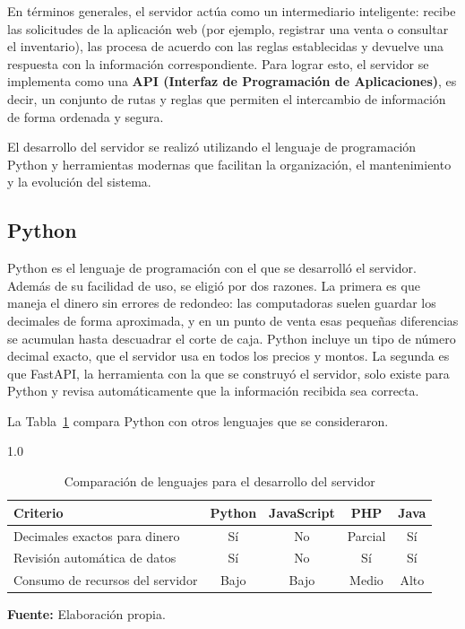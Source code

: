 En términos generales, el servidor actúa como un intermediario inteligente: recibe las solicitudes de la aplicación web (por ejemplo, registrar una venta o consultar el inventario), las procesa de acuerdo con las reglas establecidas y devuelve una respuesta con la información correspondiente. Para lograr esto, el servidor se implementa como una \textbf{API (Interfaz de Programación de Aplicaciones)}, es decir, un conjunto de rutas y reglas que permiten el intercambio de información de forma ordenada y segura.

El desarrollo del servidor se realizó utilizando el lenguaje de programación Python y herramientas modernas que facilitan la organización, el mantenimiento y la evolución del sistema.

\subsection{Python}

Python es el lenguaje de programación con el que se desarrolló el servidor. Además de su facilidad de uso, se eligió por dos razones. La primera es que maneja el dinero sin errores de redondeo: las computadoras suelen guardar los decimales de forma aproximada, y en un punto de venta esas pequeñas diferencias se acumulan hasta descuadrar el corte de caja. Python incluye un tipo de número decimal exacto, que el servidor usa en todos los precios y montos. La segunda es que FastAPI, la herramienta con la que se construyó el servidor, solo existe para Python y revisa automáticamente que la información recibida sea correcta.

La Tabla~\ref{tab:cap2-comparativa-lenguajes} compara Python con otros lenguajes que se consideraron.

\begin{table}[H]
\centering
\caption{Comparación de lenguajes para el desarrollo del servidor}
\label{tab:cap2-comparativa-lenguajes}
\begin{spacing}{1.0}
\renewcommand{\arraystretch}{1.2}
\begin{tabularx}{\textwidth}{@{}>{\raggedright}X c c c c@{}}
\toprule
\textbf{Criterio} & \textbf{Python} & \textbf{JavaScript} & \textbf{PHP} & \textbf{Java} \\
\midrule
Decimales exactos para dinero & Sí & No & Parcial & Sí \\
Revisión automática de datos & Sí & No & Sí & Sí \\
Consumo de recursos del servidor & Bajo & Bajo & Medio & Alto \\
\bottomrule
\end{tabularx}
\end{spacing}
\vspace{0.2cm}
{\footnotesize \textbf{Fuente:} Elaboración propia.}
\end{table}

